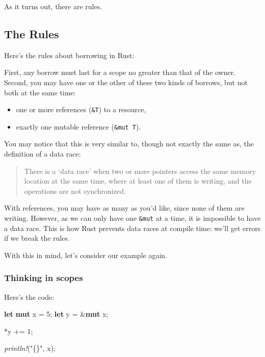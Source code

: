 \documentclass[a4paper,]{book}
\newenvironment{Shaded}{\begin{snugshade}}{\end{snugshade}}
\newcommand{\KeywordTok}[1]{\textcolor[rgb]{0.13,0.29,0.53}{\textbf{{#1}}}}
\newcommand{\DecValTok}[1]{\textcolor[rgb]{0.00,0.00,0.81}{{#1}}}
\newcommand{\StringTok}[1]{\textcolor[rgb]{0.31,0.60,0.02}{{#1}}}
\newcommand{\PreprocessorTok}[1]{\textcolor[rgb]{0.56,0.35,0.01}{\textit{{#1}}}}
\newcommand{\NormalTok}[1]{{#1}}
\providecommand{\tightlist}{%
  \setlength{\itemsep}{0pt}\setlength{\parskip}{0pt}}
\begin{document}
As it turns out, there are rules.

\subsection{The Rules}\label{the-rules}

Here's the rules about borrowing in Rust:

First, any borrow must last for a scope no greater than that of the
owner. Second, you may have one or the other of these two kinds of
borrows, but not both at the same time:

\begin{itemize}
\tightlist
\item
  one or more references (\texttt{\&T}) to a resource,
\item
  exactly one mutable reference (\texttt{\&mut\ T}).
\end{itemize}

You may notice that this is very similar to, though not exactly the same
as, the definition of a data race:

\begin{quote}
There is a `data race' when two or more pointers access the same memory
location at the same time, where at least one of them is writing, and
the operations are not synchronized.
\end{quote}

With references, you may have as many as you'd like, since none of them
are writing. However, as we can only have one \texttt{\&mut} at a time,
it is impossible to have a data race. This is how Rust prevents data
races at compile time: we'll get errors if we break the rules.

With this in mind, let's consider our example again.

\subsubsection{Thinking in scopes}\label{thinking-in-scopes}

Here's the code:

\begin{Shaded}
\begin{Highlighting}[]
\KeywordTok{let} \KeywordTok{mut} \NormalTok{x = }\DecValTok{5}\NormalTok{;}
\KeywordTok{let} \NormalTok{y = &}\KeywordTok{mut} \NormalTok{x;}

\NormalTok{*y += }\DecValTok{1}\NormalTok{;}

\PreprocessorTok{println!}\NormalTok{(}\StringTok{"\{\}"}\NormalTok{, x);}
\end{Highlighting}
\end{Shaded}
\end{document}

